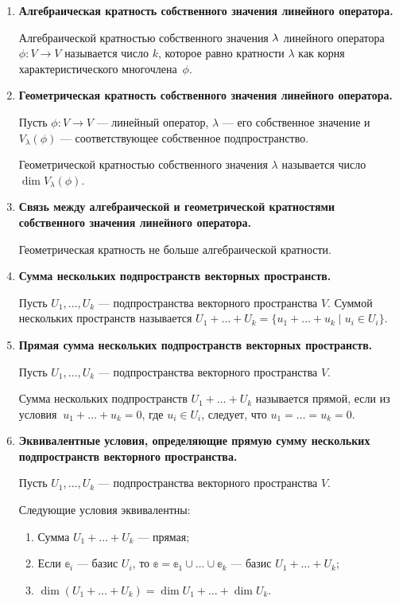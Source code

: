 \begin{enumerate}
\item \textbf{Алгебраическая кратность собственного значения линейного оператора.}

Алгебраической кратностью собственного значения $\lambda$ линейного оператора $\phi \colon V \to V$ называется число $k$, которое равно кратности $\lambda$ как корня характеристического многочлена~$\phi$.

\item \textbf{Геометрическая кратность собственного значения линейного оператора.}

Пусть $\phi\colon V \rightarrow V$ --- линейный оператор, $\lambda$ --- его собственное значение и $V_\lambda(\phi)$ --- соответствующее собственное подпространство.

Геометрической кратностью собственного значения $\lambda$ называется число $\dim V_\lambda(\phi)$.

\item \textbf{Связь между алгебраической и геометрической кратностями собственного значения линейного оператора.}

Геометрическая кратность не больше алгебраической кратности.

\item \textbf{Сумма нескольких подпространств векторных пространств.}

Пусть $U_1, \ldots, U_k$ --- подпространства векторного пространства $V$. Суммой нескольких пространств называется $U_1 + \ldots + U_k = \{u_1 + \ldots + u_k \; | \; u_i \in U_i \}$.

\item \textbf{Прямая сумма нескольких подпространств векторных пространств.}

Пусть $U_1, \ldots, U_k$ --- подпространства векторного пространства $V$.

Сумма нескольких подпространств $U_1 + \ldots + U_k$ называется прямой, если из условия $\:u_1 + \ldots + u_k = 0$, где $u_i \in U_i$, следует, что $u_1 = \ldots = u_k = 0$.

\item \textbf{Эквивалентные условия, определяющие прямую сумму нескольких подпространств векторного пространства.}

Пусть $U_1, \ldots, U_k$ --- подпространства векторного пространства $V$.

Следующие условия эквивалентны:
	\begin{enumerate}
		\item Сумма $U_1 + \ldots + U_k$ --- прямая;
		\item Если $\mathbb{e}_i$ --- базис $U_i$, то $\mathbb{e} = \mathbb{e}_1 \cup \ldots \cup \mathbb{e}_k$ --- базис $U_1 + \ldots + U_k;$
		\item $\dim(U_1 + \ldots + U_k) = \dim{U_1} + \ldots + \dim{U_k}.$
	\end{enumerate}
	

\end{enumerate}
